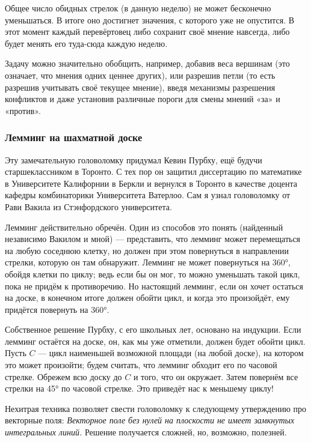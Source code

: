 Общее число обидных стрелок (в данную неделю) не может бесконечно уменьшаться.
В итоге оно достигнет значения, с которого уже не опустится.
В этот момент каждый перевёртовец либо сохранит своё мнение навсегда, либо будет менять его туда-сюда каждую неделю.

\medskip

Задачу можно значительно обобщить, например, добавив веса вершинам (это означает, что мнения одних ценнее других), или разрешив петли (то есть разрешив учитывать своё текущее мнение), введя механизмы разрешения конфликтов и даже установив различные пороги для смены мнений «за» и «против».

\subsubsection*{Лемминг на шахматной доске}

Эту замечательную головоломку придумал Кевин Пурбху, ещё будучи старшеклассником в Торонто.
С тех пор он защитил диссертацию по математике в Университете Калифорнии в Беркли и вернулся в Торонто в качестве доцента кафедры комбинаторики Университета Ватерлоо.
Сам я узнал головоломку от Рави Вакила из Стэнфордского университета.

Лемминг действительно обречён.
Один из способов это понять (найденный независимо Вакилом и мной) --- представить, что лемминг может перемещаться на любую соседнюю клетку, но должен при этом повернуться в направлении стрелки, которую он там обнаружит.
Лемминг не может повернуться на 360°, обойдя клетки по циклу;
ведь если бы он мог, то можно уменьшать такой цикл, пока не придём к противоречию.
Но настоящий лемминг, если он хочет остаться на доске, в конечном итоге должен обойти цикл, и когда это произойдёт, ему придётся повернуть на 360°.

Собственное решение Пурбху, с его школьных лет, основано на индукции.
Если лемминг остаётся на доске, он, как мы уже отметили, должен будет обойти цикл.
Пусть $C$ --- цикл наименьшей возможной площади (на любой доске), на котором это может произойти; будем считать, что лемминг обходит его по часовой стрелке.
Обрежем всю доску до $C$ и того, что он окружает.
Затем повернём все стрелки на 45° по часовой стрелке.
Это приведёт нас к меньшему циклу!

\begin{addedbytheeditors}
Нехитрая техника позволяет свести головоломку к следующему утверждению про векторные поля: \emph{Векторное поле без нулей на плоскости не имеет замкнутых интегральных линий.}
Решение получается сложней, но, возможно, полезней.\pr
\end{addedbytheeditors}
